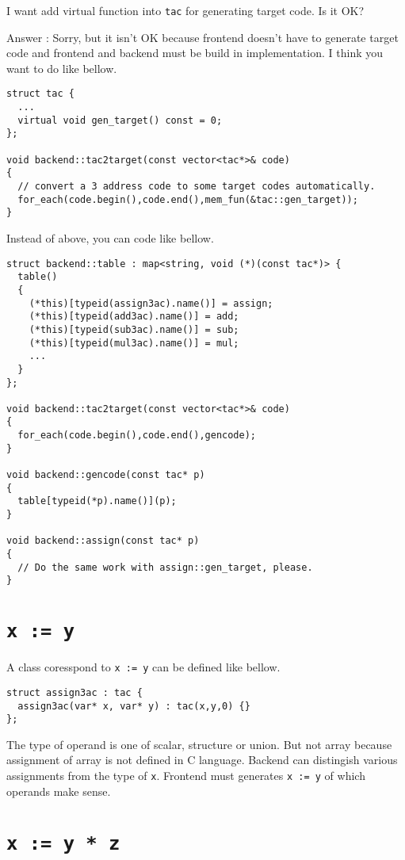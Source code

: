 \begin{QandA}
I want add virtual function into {\tt{tac}} for generating target
code. Is it OK?

Answer : Sorry, but it isn't OK because frontend doesn't have to
generate target code and frontend and backend must be build in
implementation. I think you want to do like bellow.
\begin{verbatim}
struct tac {
  ...
  virtual void gen_target() const = 0;
};

void backend::tac2target(const vector<tac*>& code)
{
  // convert a 3 address code to some target codes automatically.
  for_each(code.begin(),code.end(),mem_fun(&tac::gen_target));
}
\end{verbatim}
Instead of above, you can code like bellow.
\begin{verbatim}
struct backend::table : map<string, void (*)(const tac*)> {
  table()
  {
    (*this)[typeid(assign3ac).name()] = assign;
    (*this)[typeid(add3ac).name()] = add;
    (*this)[typeid(sub3ac).name()] = sub;
    (*this)[typeid(mul3ac).name()] = mul;
    ...
  }
};

void backend::tac2target(const vector<tac*>& code)
{
  for_each(code.begin(),code.end(),gencode);
}

void backend::gencode(const tac* p)
{
  table[typeid(*p).name()](p);
}

void backend::assign(const tac* p)
{
  // Do the same work with assign::gen_target, please.
}
\end{verbatim}
\end{QandA}

\section{{\tt{x := y}}}

A class coresspond to {\tt{x := y}} can be defined like bellow.
\begin{verbatim}
struct assign3ac : tac {
  assign3ac(var* x, var* y) : tac(x,y,0) {}
};
\end{verbatim}
The type of operand is one of scalar, structure or union. But not
array because assignment of array is not defined in C language.
Backend can distingish various assignments from the type of {\tt{x}}.
Frontend must generates {\tt{x := y}} of which operands make sense.

\section{{\tt{x := y * z}}}

